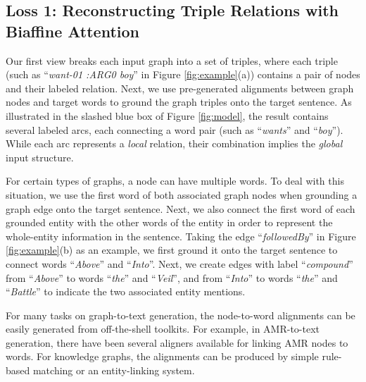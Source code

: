 \documentclass[11pt,a4paper]{article}
\begin{document}
\subsection{Loss 1: Reconstructing Triple Relations with Biaffine Attention}


Our first view breaks each input graph into a set of triples, where each triple (such as ``\emph{want-01 :ARG0 boy}'' in Figure \ref{fig:example}(a)) contains a pair of nodes and their labeled relation.
Next, we use pre-generated alignments between graph nodes and target words to ground the graph triples onto the target sentence.
As illustrated in the slashed blue box of Figure \ref{fig:model}, the result contains several labeled arcs, each connecting a word pair (such as ``\emph{wants}'' and ``\emph{boy}'').
While each arc represents a \emph{local} relation, their combination implies the \emph{global} input structure.


For certain types of graphs, a node can have multiple words.
To deal with this situation, we use the first word of both associated graph nodes when grounding a graph edge onto the target sentence.
Next, 
we also connect the first word of each grounded entity with the other words of the entity in order to represent the whole-entity information in the sentence.
Taking the edge ``\emph{followedBy}'' in Figure \ref{fig:example}(b) as an example, we first ground it onto the target sentence to connect words ``\emph{Above}'' and ``\emph{Into}''.
Next, we create edges with label ``\emph{compound}'' from ``\emph{Above}'' to words ``\emph{the}'' and ``\emph{Veil}'', and from ``\emph{Into}'' to words ``\emph{the}'' and  ``\emph{Battle}'' to indicate the two associated entity mentions.


For many tasks on graph-to-text generation, the node-to-word alignments can be easily generated from off-the-shell toolkits.
For example, in AMR-to-text generation, there have been several aligners \citep{pourdamghani2014aligning,flanigan2016cmu,wang2017getting,liu2018amr,szubert2018structured} available for linking AMR nodes to words.
For knowledge graphs, the alignments can be produced by simple rule-based matching or an entity-linking system.
\end{document}
